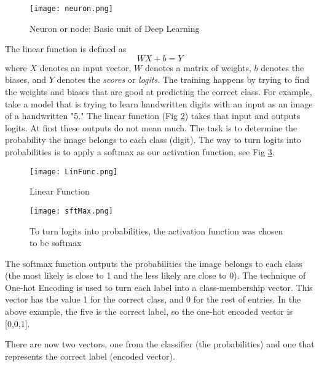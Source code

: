 \begin{figure}[!h]
 \begin{center}
 \texttt{[image: neuron.png]}
 \caption{Neuron or node: Basic unit of Deep Learning}
 \label{fig:neuron}
 \end{center}
 \end{figure}
 
 The linear function is defined as 
\begin{equation}
WX+b = Y
\end{equation}
where $X$ denotes an input vector, $W$ denotes a matrix of weights, $b$ denotes the biases, and $Y$ denotes the \emph{scores} or \emph{logits}.  The training happens by trying to find the weights and biases that are good at predicting the correct class.  
For example, take a model that is trying to learn handwritten digits with an input as an image of a handwritten "5."  The linear function (Fig \ref{fig:Lin}) takes that input and outputs logits.  At first these outputs do not mean much.  The task is to determine the probability the image belongs to each class (digit).  The way to turn logits into probabilities is to apply a softmax as our activation function, see Fig \ref{fig:SftMax}.
\begin{figure}[!h]
 \begin{center}
 \texttt{[image: LinFunc.png]}
 \caption{Linear Function }
 \label{fig:Lin}
 \end{center}
 \end{figure}
 
\begin{figure}[!h]
 \begin{center}
 \texttt{[image: sftMax.png]}
 \caption{To turn logits into probabilities, the activation function was chosen to be softmax}
 \label{fig:SftMax}
 \end{center}
 \end{figure}
 
The softmax function outputs the probabilities the image belongs to each class (the most likely is close to 1 and the less likely are close to 0).  The technique of One-hot Encoding is used to turn each label into a class-membership vector.  This vector has the value 1 for the correct class, and 0 for the rest of entries.  In the above example, the five is the correct label, so the one-hot encoded vector is [0,0,1]. 

There are now two vectors, one from the classifier (the probabilities) and one that represents the correct label (encoded vector). 

